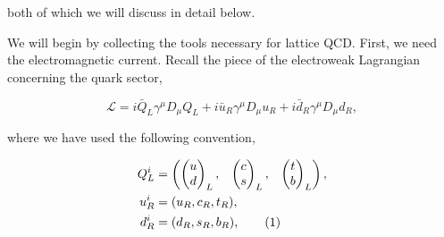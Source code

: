 \documentclass{article}
\numberwithin{equation}{section} %
\begin{document}
\noindent both of which we will discuss in detail below. 

We will begin by collecting the tools necessary for lattice QCD. First, we need the electromagnetic current. Recall the piece of the electroweak Lagrangian concerning the quark sector,

\begin{equation}
\mathcal{L}=i\bar{Q}_L\gamma^\mu D_\mu Q_L + i\bar{u}_R\gamma^\mu D_\mu u_R + i\bar{d}_R\gamma^\mu D_\mu d_R,
\label{ewqLagr}
\end{equation}

\noindent where we have used the following convention\cite{sm},

\begin{align*}
Q_L^i&=\begin{pmatrix}
\begin{pmatrix}
u\\d
\end{pmatrix}_L, & \begin{pmatrix}
c\\s
\end{pmatrix}_L, & \begin{pmatrix}
t\\b
\end{pmatrix}_L
\end{pmatrix},\\
u^i_R&=(u_R	,c_R,t_R),\\
d^i_R&=(d_R,s_R,b_R),
\tag{\refstepcounter{equation}\theequation}
\end{align*}


%
%
\end{document}
